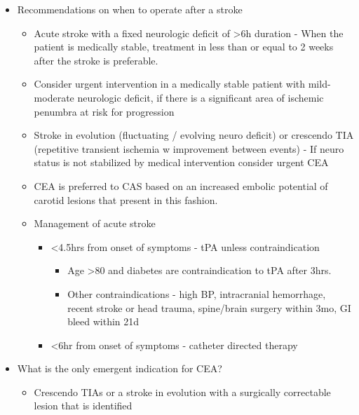 \documentclass[
]{book}
\providecommand{\tightlist}{%
  \setlength{\itemsep}{0pt}\setlength{\parskip}{0pt}}
\begin{document}
\begin{itemize}
\item
  Recommendations on when to operate after a stroke

  \begin{itemize}
  \item
    Acute stroke with a fixed neurologic deficit of \textgreater6h duration -
    When the patient is medically stable, treatment in less than or
    equal to 2 weeks after the stroke is preferable.
    \citep{rothwellEndarterectomySymptomaticCarotid2004, meershoekTimingCarotidIntervention2018}
  \item
    Consider urgent intervention in a medically stable patient with
    mild-moderate neurologic deficit, if there is a significant area
    of ischemic penumbra at risk for progression
  \item
    Stroke in evolution (fluctuating / evolving neuro deficit) or
    crescendo TIA (repetitive transient ischemia w improvement
    between events) - If neuro status is not stabilized by medical
    intervention consider urgent CEA
  \item
    CEA is preferred to CAS based on an increased embolic potential
    of carotid lesions that present in this fashion.
    \citet{rantnerEarlyEndarterectomyCarries}
  \item
    Management of acute stroke \citet{powers2018GuidelinesEarly2018}

    \begin{itemize}
    \item
      \textless4.5hrs from onset of symptoms - tPA unless
      contraindication

      \begin{itemize}
      \item
        Age \textgreater80 and diabetes are contraindication to tPA after
        3hrs.
      \item
        Other contraindications - high BP, intracranial
        hemorrhage, recent stroke or head trauma, spine/brain
        surgery within 3mo, GI bleed within 21d
      \end{itemize}
    \item
      \textless6hr from onset of symptoms - catheter directed therapy
    \end{itemize}
  \end{itemize}
\item
  What is the only emergent indication for CEA?

  \begin{itemize}
  \tightlist
  \item
    Crescendo TIAs or a stroke in evolution with a surgically
    correctable lesion that is identified
  \end{itemize}
\end{itemize}
\end{document}
